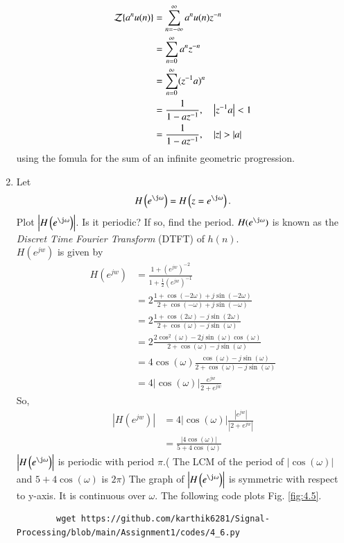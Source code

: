 \documentclass[journal,12pt,twocolumn]{IEEEtran}
\renewcommand\thesection{\arabic{section}}
\begin{document}
\begin{enumerate}[label=\thesection.\arabic*]
\begin{equation}
	\end{equation}
	\solution
	\begin{align}
		{\mathcal {Z}}\{a^nu(n)\}&=\sum _{n=-\infty }^{\infty }a^nu(n)z^{-n}\\
		&=\sum _{n=0 }^{\infty }a^nz^{-n}\\
		&=\sum _{n=0 }^{\infty }(z^{-1}a)^{n}\\
		&=\frac{1}{1-az^{-1}}, \quad \left\vert z^{-1}a\right\vert < 1\\
		&=\frac{1}{1-az^{-1}}, \quad \left\vert z\right\vert > \left\vert a\right\vert 
	\end{align}
	using the fomula for the sum of an infinite geometric progression.
	\item 
	Let
	\begin{equation}
		H\brak{e^{\j \omega}} = H\brak{z = e^{\j \omega}}.
	\end{equation}
	Plot $\abs{H\brak{e^{\j \omega}}}$.  Is it periodic? If so, find the period.  $H(e^{\j \omega})$ is
	known as the {\em Discret Time Fourier Transform} (DTFT) of $h(n)$.
	\\
	\solution $H(e^{jw})$ is given by
	\begin{align}
		H(e^{jw})&=\frac{1+(e^{jw})^{-2}}{1+\frac{1}{2}(e^{jw})^{-1}}\\
		&=2\frac{1+\cos(-2\omega)+j\sin(-2\omega)}{2+\cos(-\omega)+j\sin(-\omega)}\\
		&=2\frac{1+\cos(2\omega)-j\sin(2\omega)}{2+\cos(\omega)-j\sin(\omega)}\\
		&=2\frac{2\cos^2(\omega)-2j\sin(\omega)\cos(\omega)}{2+\cos(\omega)-j\sin(\omega)}\\
		&=4\cos(\omega)\frac{\cos(\omega)-j\sin(\omega)}{2+\cos(\omega)-j\sin(\omega)}\\
		&=4|\cos(\omega)| \frac{e^{jw}}{2+e^{jw}}
	\end{align}
	So,
	\begin{align}
		|H(e^{jw})|&=4 |\cos(\omega)| \frac{|e^{jw}|}{|2+e^{jw}|}\\
		&=\frac{|4\cos(\omega)|}{5+4\cos(\omega)}
	\end{align}
	 $\abs{H\brak{e^{\j\omega}}}$ is periodic with period $\pi$.( The LCM of the period of $|\cos(\omega)|$ and $5+4\cos(\omega)$ is $2\pi$)
	The graph of $\abs{H\brak{e^{\j\omega}}}$ is symmetric with respect to y-axis. It is continuous over $\omega$. The following code plots Fig. \ref{fig:4.5}.
	\begin{lstlisting}
		wget https://github.com/karthik6281/Signal-Processing/blob/main/Assignment1/codes/4_6.py
	\end{lstlisting}

\end{enumerate}
\end{document}
